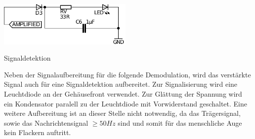 \begin{floatingfigure}[r]{7cm}
\includegraphics[width=6.5cm]{gfx/detect.pdf}
\caption{Signaldetektion}
\label{fig:detect}
\end{floatingfigure}
\noindent
Neben der Signalaufbereitung für die folgende Demodulation, wird das ver\-stär\-kte Signal auch für eine Signaldetektion aufbereitet. Zur Signalisierung wird eine Leuchtdiode an der Ge\-häu\-se\-front verwendet. Zur Glät\-tung der Spannung wird ein Kondensator paralell zu der Leuchtdiode mit Vorwiderstand geschaltet. Eine weitere Aufbereitung ist an dieser Stelle nicht notwendig, da das Trägersignal, sowie das Nachrichtensignal $\geq 50 Hz$  sind und somit für das menschliche Auge kein Flackern auftritt. 


